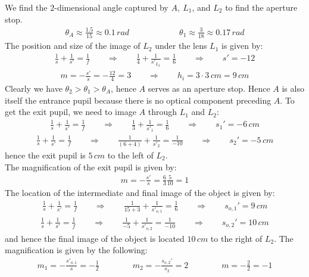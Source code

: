 \documentclass[11pt]{book}
\theoremstyle{break}
\theoremstyle{break}
\begin{document}
We find the $2$-dimensional angle captured by $A,\ L_1$, and $L_2$ to find the aperture stop.
\begin{align*}
\theta_A \approx \frac{1.5}{15} \approx 0.1\, rad \qquad\qquad\qquad \theta_1 \approx \frac{3}{18}\approx 0.17\, rad
\end{align*}
The position and size of the image of $L_2$ under the lens $L_1$ is given by:
\begin{align*}
\frac{1}{s}+\frac{1}{s'} = \frac{1}{f} \qquad \Rightarrow \qquad \frac{1}{4}+\frac{1}{s'_{L_2}} = \frac{1}{6} \qquad \Rightarrow \qquad s' = -12
\end{align*}
\begin{align*}
m = -\frac{s'}{s} = -\frac{12}{4} = 3 \qquad \Rightarrow \qquad h_i = 3\cdot 3\, cm = 9\, cm
\end{align*}
Clearly we have $\theta_2 > \theta_1 > \theta_A$, hence $A$ serves as an aperture stop. Hence $A$ is also itself the entrance pupil because there is no optical component preceding $A$. To get the exit pupil, we need to image $A$ through $L_1$ and $L_2$:
\begin{align*}
\frac{1}{s}+\frac{1}{s'} = \frac{1}{f} \qquad \Rightarrow \qquad \frac{1}{3}+\frac{1}{s'_{1}} = \frac{1}{6} \qquad \Rightarrow \qquad s_1' = -6\, cm
\end{align*}
\begin{align*}
\frac{1}{s}+\frac{1}{s'} = \frac{1}{f} \qquad \Rightarrow \qquad \frac{1}{(6+4)}+\frac{1}{s'_{2}} = \frac{1}{-10} \qquad \Rightarrow \qquad s_2' = -5\, cm
\end{align*}
hence the exit pupil is $5\, cm$ to the left of $L_2$. \\
The magnification of the exit pupil is given by:
\begin{align*}
m = -\frac{s'}{s} = \frac{6}{3}\frac{5}{10} = 1
\end{align*}
The location of the intermediate and final image of the object is given by:
\begin{align*}
\frac{1}{s}+\frac{1}{s'} = \frac{1}{f} \qquad \Rightarrow \qquad \frac{1}{15+3}+\frac{1}{s'_{o,1}} = \frac{1}{6} \qquad \Rightarrow \qquad s_{o,1}' = 9\, cm
\end{align*}
\begin{align*}
\frac{1}{s}+\frac{1}{s'} = \frac{1}{f} \qquad \Rightarrow \qquad \frac{1}{-5}+\frac{1}{s'_{o,2}} = \frac{1}{-10} \qquad \Rightarrow \qquad s_{o,2}' = 10\, cm
\end{align*}
and hence the final image of the object is located $10\, cm$ to the right of $L_2$. The magnification is given by the following:
\begin{align*}
m_1 = -\frac{s'_{o,1}}{s} = -\frac{1}{2} \qquad \qquad  m_2 = -\frac{s_{o,2}'}{s_2} = 2\qquad\qquad m= -\frac{2}{2} = -1
\end{align*}
\end{document}
